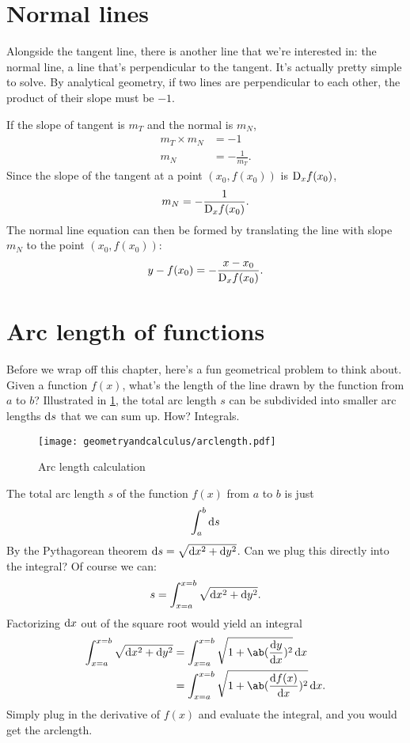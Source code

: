 \section{Normal lines}
\label{sec:normal-lines}

Alongside the tangent line, there is another line that we're interested in: the normal line, a line that's perpendicular to the tangent. It's actually pretty simple to solve. By analytical geometry, if two lines are perpendicular to each other, the product of their slope must be $-1$.

If the slope of tangent is $m_T$ and the normal is $m_N$,
\begin{align}
	m_T \times m_N &= -1 \\
	m_N &= -\frac{1}{m_T}.
\end{align}
Since the slope of the tangent at a point $(x_0, f(x_0))$ is $\mdif{x}f(x_0)$,
\begin{equation}
	m_N = -\frac{1}{\mdif{x}f(x_0)}.
\end{equation}
The normal line equation can then be formed by translating the line with slope $m_N$ to the point $(x_0, f(x_0))$:
\begin{equation}
	y - f(x_0) = -\frac{x - x_0}{\mdif{x}f(x_0)}.
\end{equation}

\section{Arc length of functions}

Before we wrap off this chapter, here's a fun geometrical problem to think about. Given a function $f(x)$, what's the length of the line drawn by the function from $a$ to $b$? Illustrated in \cref{fig:arclength}, the total arc length $s$ can be subdivided into smaller arc lengths $\odif{s}$ that we can sum up. How? Integrals. 

\begin{figure}[ht]
	\centering
	\texttt{[image: geometryandcalculus/arclength.pdf]}
	\caption{Arc length calculation}
	\label{fig:arclength}
\end{figure}

The total arc length $s$ of the function $f(x)$ from $a$ to $b$ is just
\begin{equation}
	\int_{a}^{b}\odif{s}
\end{equation}
By the Pythagorean theorem $\odif{s} = \sqrt{\odif{x}^2 + \odif{y}^2}$. Can we plug this directly into the integral? Of course we can:
\begin{equation}
	s = \int_{x = a}^{x = b}\sqrt{\odif{x}^2 + \odif{y}^2}.
\end{equation}
Factorizing $\odif{x}$ out of the square root would yield an integral
\begin{align}
	\int_{x = a}^{x = b}\sqrt{\odif{x}^2 + \odif{y}^2} &= \int_{x = a}^{x = b}\sqrt{1 + \ab(\odv{y}{x})^2}\odif{x} \\
													   &= \int_{x = a}^{x = b}\sqrt{1 + \ab(\odv{f(x)}{x})^2}\odif{x}.
\end{align}
Simply plug in the derivative of $f(x)$ and evaluate the integral, and you would get the arclength.


